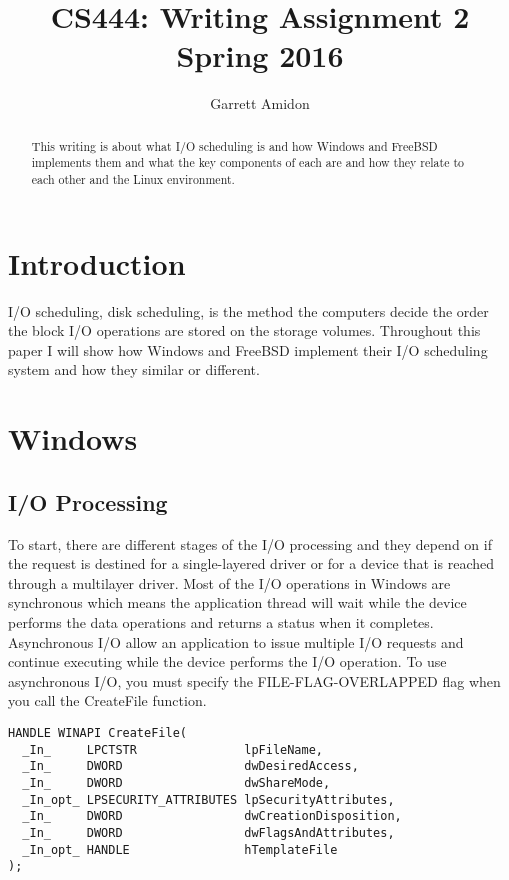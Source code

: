\documentclass[letterpaper,10pt,titlepage,draftclsnofoot,onecolumn]{IEEEtran}
\title{CS444: Writing Assignment 2 \\
	\large Spring 2016}
\author{Garrett Amidon}
\begin{document}
\begin{titlingpage}
    \maketitle
	\centering{}
    \begin{abstract}
        This writing is about what I/O scheduling is and how Windows and FreeBSD implements them and what the key components of each are and how they relate to each other and the Linux environment.   
    \end{abstract}
\end{titlingpage}
\section{Introduction}

I/O scheduling, disk scheduling, is the method the computers decide the order the block I/O operations are stored on the storage volumes. Throughout this paper I will show how Windows and FreeBSD implement their I/O scheduling system and how they similar or different. 

\section{Windows}

\subsection{I/O Processing}

To start, there are different stages of the I/O processing and they depend on if the request is destined for a single-layered driver or for a device that is reached through a multilayer driver. Most of the I/O operations in Windows are synchronous which means the application thread will wait while the device performs the data operations and returns a status when it completes. \cite{Windows} Asynchronous I/O allow an application to issue multiple I/O requests and continue executing while the device performs the I/O operation. To use asynchronous I/O, you must specify the FILE-FLAG-OVERLAPPED flag when you call the CreateFile function.

\begin{lstlisting}
HANDLE WINAPI CreateFile(
  _In_     LPCTSTR               lpFileName,
  _In_     DWORD                 dwDesiredAccess,
  _In_     DWORD                 dwShareMode,
  _In_opt_ LPSECURITY_ATTRIBUTES lpSecurityAttributes,
  _In_     DWORD                 dwCreationDisposition,
  _In_     DWORD                 dwFlagsAndAttributes,
  _In_opt_ HANDLE                hTemplateFile
); 
\end{lstlisting}\cite{create_file}
\end{document}
